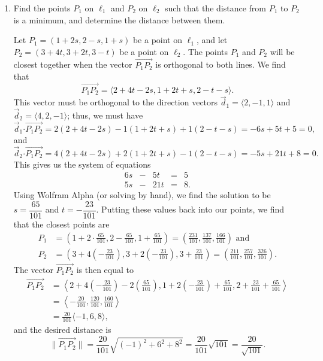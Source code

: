 \documentclass[letterpaper,12pt]{amsart}
\newcommand{\len}[1]{\lVert #1\rVert}
\newcommand{\dotp}{\boldsymbol{\cdot}}
\begin{document}
\begin{enumerate}
\begin{enumerate}
\bigskip

 \item Find the points $P_1$ on $\ell_1$ and $P_2$ on $\ell_2$ such that the distance from $P_1$ to $P_2$ is a minimum, and determine the distance between them.

\bigskip

Let $P_1 = (1+2s,2-s,1+s)$ be a point on $\ell_1$, and let $P_2=(3+4t,3+2t,3-t)$ be a point on $\ell_2$. The points $P_1$ and $P_2$ will be closest together when the vector $\overrightarrow{P_1P_2}$ is orthogonal to both lines. We find that
\[
 \overrightarrow{P_1P_2} = \langle 2+4t-2s, 1+2t+s, 2-t-s\rangle.
\]
This vector must be orthogonal to the direction vectors $\vec{d}_1 = \langle 2, -1, 1\rangle$ and $\vec{d}_2 = \langle 4, 2 ,-1\rangle$; thus, we must have
\[
 \vec{d}_1\dotp \overrightarrow{P_1P_2} = 2(2+4t-2s)-1(1+2t+s)+1(2-t-s) = -6s+5t+5=0,
\]
and
\[
 \vec{d}_2\dotp \overrightarrow{P_1P_2} = 4(2+4t-2s)+2(1+2t+s)-1(2-t-s) = -5s+21t+8=0.
\]
This gives us the system of equations
\[
 \begin{array}{ccccc}
  6s&-&5t&=&5\\
  5s&-&21t&=&8.
 \end{array}
\]
Using Wolfram Alpha (or solving by hand), we find the solution to be\\ $s=\dfrac{65}{101}$ and $t=-\dfrac{23}{101}$. Putting these values back into our points, we find that the closest points are
\begin{align*}
 P_1 & = \left(1+2\cdot\frac{65}{101}, 2-\frac{65}{101}, 1+\frac{65}{101}\right) = \left(\frac{231}{101}, \frac{137}{101}, \frac{166}{101}\right) \text{ and} \\
 P_2 & = \left(3+4\left(-\frac{23}{101}\right), 3+2\left(-\frac{23}{101}\right), 3+\frac{23}{101}\right) = \left(\frac{211}{101}, \frac{257}{101}, \frac{326}{101}\right).
\end{align*}
The vector $\overrightarrow{P_1P_2}$ is then equal to
\begin{align*}
 \overrightarrow{P_1P_2} &= \left\langle 2+4\left(-\frac{23}{101}\right)-2\left(\frac{65}{101}\right), 1+2\left(-\frac{23}{101}\right)+\frac{65}{101}, 2+\frac{23}{101}+\frac{65}{101}\right\rangle\\
 & = \left\langle -\frac{20}{101}, \frac{120}{101}, \frac{160}{101}\right\rangle\\
& = \frac{20}{101}\langle -1,6,8\rangle,
\end{align*}
and the desired distance is
\[
 \len{\overrightarrow{P_1P_2}} = \frac{20}{101}\sqrt{(-1)^2+6^2+8^2} = \frac{20}{101}\sqrt{101} = \frac{20}{\sqrt{101}}.
\]


\end{enumerate}
\end{enumerate}
\end{document}
